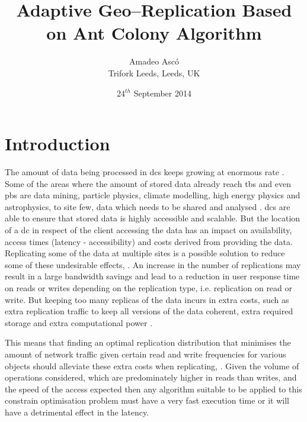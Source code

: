 \documentclass[english]{article}
\begin{document}
\title{Adaptive Geo--Replication Based on Ant Colony Algorithm}

\author{Amadeo Asc\'{o}\\ Trifork Leeds, Leeds, UK}

\date{24$^{th}$ September 2014}

\maketitle



\section{Introduction}
	The amount of data being processed in \glspl{dc} keeps growing at enormous rate \cite{Tolle2011a, Cisco2014a, Chanthadavong2014a}. Some of the areas where the amount of stored data already reach \glspl{tb} and even \glspl{pb} are data mining, particle physics, climate modelling, high energy physics and astrophysics, to site few, data which needs to be shared and analysed \cite{KingsyGrace2013a, MohdZin2012a, Naseera2009a}. \glspl{dc} are able to ensure that stored data is highly accessible and scalable. But the location of a \gls{dc} in respect of the client accessing the data has an impact on availability, access times (latency - accessibility) and costs derived from providing the data. Replicating some of the data at multiple sites is a possible solution to reduce some of these undesirable effects, \cite{Briquemont2014a, Abad2011a, Venugopal2006a}. An increase in the number of replications may result in a large bandwidth savings and lead to a reduction in user response time on reads or writes depending on the replication type, i.e. replication on read or write. But keeping too many replicas of the data incurs in extra costs, such as extra replication traffic to keep all versions of the data coherent, extra required storage and extra computational power \cite{Goel2006a}.
	
	This means that finding an optimal replication distribution that minimises the amount of network traffic given certain read and write frequencies for various objects should alleviate these extra costs when replicating, \cite{Wolfson1990a, Briquemont2014a}. Given the volume of operations considered, which are predominately higher in reads than writes, and the speed of the access expected then any algorithm suitable to be applied to this constrain optimisation problem must have a very fast execution time or it will have a detrimental effect in the latency.
\end{document}
